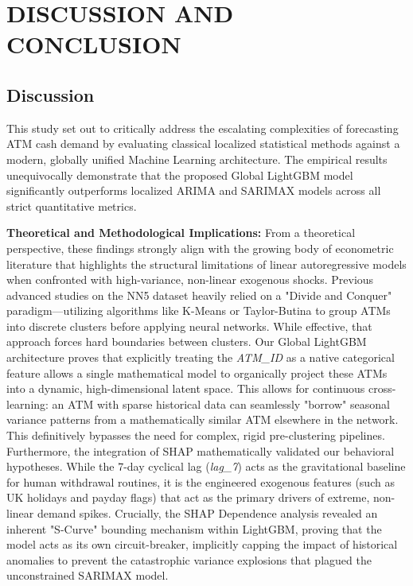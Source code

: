 \documentclass[conference, 12pt, onecolumn]{IEEEtran}
\begin{document}
\section{DISCUSSION AND CONCLUSION}

\subsection{Discussion}
This study set out to critically address the escalating complexities of forecasting ATM cash demand by evaluating classical localized statistical methods against a modern, globally unified Machine Learning architecture. The empirical results unequivocally demonstrate that the proposed Global LightGBM model significantly outperforms localized ARIMA and SARIMAX models across all strict quantitative metrics. 

\textbf{Theoretical and Methodological Implications:} From a theoretical perspective, these findings strongly align with the growing body of econometric literature that highlights the structural limitations of linear autoregressive models when confronted with high-variance, non-linear exogenous shocks. Previous advanced studies on the NN5 dataset heavily relied on a "Divide and Conquer" paradigm—utilizing algorithms like K-Means or Taylor-Butina to group ATMs into discrete clusters before applying neural networks. While effective, that approach forces hard boundaries between clusters. Our Global LightGBM architecture proves that explicitly treating the \textit{ATM\_ID} as a native categorical feature allows a single mathematical model to organically project these ATMs into a dynamic, high-dimensional latent space. This allows for continuous cross-learning: an ATM with sparse historical data can seamlessly "borrow" seasonal variance patterns from a mathematically similar ATM elsewhere in the network. This definitively bypasses the need for complex, rigid pre-clustering pipelines. Furthermore, the integration of SHAP mathematically validated our behavioral hypotheses. While the 7-day cyclical lag (\textit{lag\_7}) acts as the gravitational baseline for human withdrawal routines, it is the engineered exogenous features (such as UK holidays and payday flags) that act as the primary drivers of extreme, non-linear demand spikes. Crucially, the SHAP Dependence analysis revealed an inherent "S-Curve" bounding mechanism within LightGBM, proving that the model acts as its own circuit-breaker, implicitly capping the impact of historical anomalies to prevent the catastrophic variance explosions that plagued the unconstrained SARIMAX model.
\end{document}
